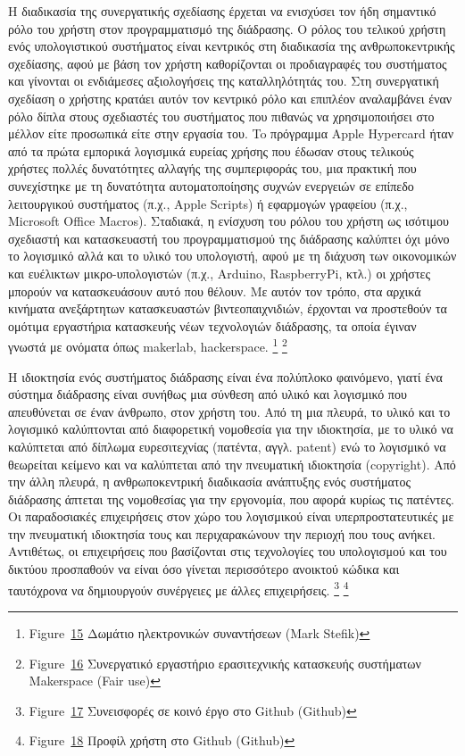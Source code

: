 \documentclass[
]{article}
\begin{document}
Η διαδικασία της συνεργατικής σχεδίασης έρχεται να ενισχύσει τον ήδη
σημαντικό ρόλο του χρήστη στον προγραμματισμό της διάδρασης. Ο ρόλος του
τελικού χρήστη ενός υπολογιστικού συστήματος είναι κεντρικός στη
διαδικασία της ανθρωποκεντρικής σχεδίασης, αφού με βάση τον χρήστη
καθορίζονται οι προδιαγραφές του συστήματος και γίνονται οι ενδιάμεσες
αξιολογήσεις της καταλληλότητάς του. Στη συνεργατική σχεδίαση ο χρήστης
κρατάει αυτόν τον κεντρικό ρόλο και επιπλέον αναλαμβάνει έναν ρόλο δίπλα
στους σχεδιαστές του συστήματος που πιθανώς να χρησιμοποιήσει στο μέλλον
είτε προσωπικά είτε στην εργασία του. To πρόγραμμα Apple Hypercard ήταν
από τα πρώτα εμπορικά λογισμικά ευρείας χρήσης που έδωσαν στους τελικούς
χρήστες πολλές δυνατότητες αλλαγής της συμπεριφοράς του, μια πρακτική
που συνεχίστηκε με τη δυνατότητα αυτοματοποίησης συχνών ενεργειών σε
επίπεδο λειτουργικού συστήματος (π.χ., Apple Scripts) ή εφαρμογών
γραφείου (π.χ., Microsoft Office Macros). Σταδιακά, η ενίσχυση του ρόλου
του χρήστη ως ισότιμου σχεδιαστή και κατασκευαστή του προγραμματισμού
της διάδρασης καλύπτει όχι μόνο το λογισμικό αλλά και το υλικό του
υπολογιστή, αφού με τη διάχυση των οικονομικών και ευέλικτων
μικρο-υπολογιστών (π.χ., Arduino, RaspberryPi, κτλ.) οι χρήστες μπορούν
να κατασκευάσουν αυτό που θέλουν. Με αυτόν τον τρόπο, στα αρχικά
κινήματα ανεξάρτητων κατασκευαστών βιντεοπαιχνιδιών, έρχονται να
προστεθούν τα ομότιμα εργαστήρια κατασκευής νέων τεχνολογιών διάδρασης,
τα οποία έγιναν γνωστά με ονόματα όπως makerlab, hackerspace.
\footnote{Figure~\protect\hyperlink{fig:xerox-colab}{15} Δωμάτιο
  ηλεκτρονικών συναντήσεων (Mark Stefik)} \footnote{Figure~\protect\hyperlink{fig:makerspace}{16}
  Συνεργατικό εργαστήριο ερασιτεχνικής κατασκευής συστήματων Makerspace
  (Fair use)}

Η ιδιοκτησία ενός συστήματος διάδρασης είναι ένα πολύπλοκο φαινόμενο,
γιατί ένα σύστημα διάδρασης είναι συνήθως μια σύνθεση από υλικό και
λογισμικό που απευθύνεται σε έναν άνθρωπο, στον χρήστη του. Από τη μια
πλευρά, το υλικό και το λογισμικό καλύπτονται από διαφορετική νομοθεσία
για την ιδιοκτησία, με το υλικό να καλύπτεται από δίπλωμα ευρεσιτεχνίας
(πατέντα, αγγλ. patent) ενώ το λογισμικό να θεωρείται κείμενο και να
καλύπτεται από την πνευματική ιδιοκτησία (copyright). Από την άλλη
πλευρά, η ανθρωποκεντρική διαδικασία ανάπτυξης ενός συστήματος διάδρασης
άπτεται της νομοθεσίας για την εργονομία, που αφορά κυρίως τις πατέντες.
Οι παραδοσιακές επιχειρήσεις στον χώρο του λογισμικού είναι
υπερπροστατευτικές με την πνευματική ιδιοκτησία τους και περιχαρακώνουν
την περιοχή που τους ανήκει. Αντιθέτως, οι επιχειρήσεις που βασίζονται
στις τεχνολογίες του υπολογισμού και του δικτύου προσπαθούν να είναι όσο
γίνεται περισσότερο ανοικτού κώδικα και ταυτόχρονα να δημιουργούν
συνέργειες με άλλες επιχειρήσεις. \footnote{Figure~\protect\hyperlink{fig:github-contributions}{17}
  Συνεισφορές σε κοινό έργο στο Github (Github)} \footnote{Figure~\protect\hyperlink{fig:github-profile}{18}
  Προφίλ χρήστη στο Github (Github)}
\end{document}
